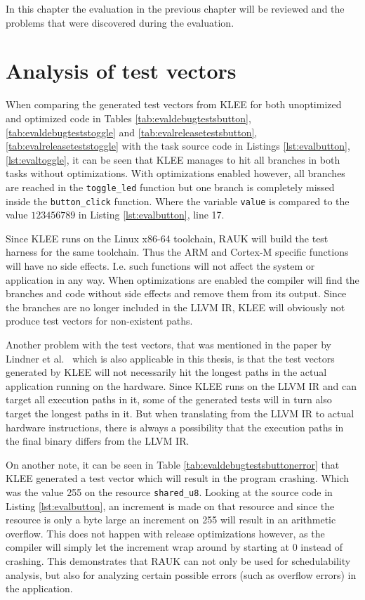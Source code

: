 In this chapter the evaluation in the previous chapter will be reviewed
and the problems that were discovered during the evaluation.

\section{Analysis of test vectors}
When comparing the generated test vectors from KLEE for both unoptimized and
optimized code in Tables \ref{tab:evaldebugtestsbutton},
\ref{tab:evaldebugteststoggle} and \ref{tab:evalreleasetestsbutton},
\ref{tab:evalreleaseteststoggle} with the task source code in Listings
\ref{lst:evalbutton}, \ref{lst:evaltoggle}, it can be seen that KLEE manages to
hit all branches in both tasks without optimizations. With optimizations
enabled however, all branches are reached in the \texttt{toggle\_led} function
but one branch is completely missed inside the \texttt{button\_click} function.
Where the variable \texttt{value} is compared to the value $123456789$ in
Listing \ref{lst:evalbutton}, line 17.

Since KLEE runs on the Linux x86-64 toolchain, RAUK will build the test harness
for the same toolchain. Thus the ARM and Cortex-M specific functions will have
no side effects. I.e. such functions will not affect the system or application
in any way. When optimizations are enabled the compiler will find the branches
and code without side effects and remove them from its output. Since the
branches are no longer included in the LLVM IR, KLEE will obviously not
produce test vectors for non-existent paths.

Another problem with the test vectors, that was mentioned in the paper by
Lindner et al.\ \cite{lindner} which is also applicable in this thesis, is that
the test vectors generated by KLEE will not necessarily hit the longest paths
in the actual application running on the hardware. Since KLEE runs on the LLVM
IR and can target all execution paths in it, some of the generated tests will
in turn also target the longest paths in it. But when translating from the LLVM
IR to actual hardware instructions, there is always a possibility that the
execution paths in the final binary differs from the LLVM IR.

On another note, it can be seen in Table \ref{tab:evaldebugtestsbuttonerror}
that KLEE generated a test vector which will result in the program crashing.
Which was the value 255 on the resource \texttt{shared\_u8}. Looking at the
source code in Listing \ref{lst:evalbutton}, an increment is made on that
resource and since the resource is only a byte large an increment on 255 will
result in an arithmetic overflow. This does not happen with release
optimizations however, as the compiler will simply let the increment wrap
around by starting at 0 instead of crashing. This demonstrates that RAUK
can not only be used for schedulability analysis, but also for analyzing
certain possible errors (such as overflow errors) in the application.

